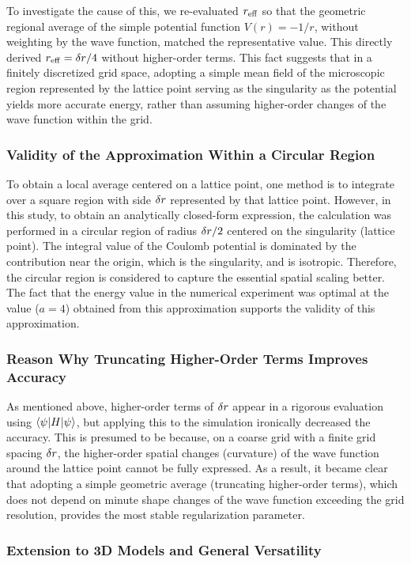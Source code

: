 \documentclass[jctc-draft.tex]{subfiles}
\begin{document}
To investigate the cause of this, we re-evaluated $r_{\mathrm{eff}}$ so that the geometric
regional average of the simple potential function $V(r)=-1/r$, without weighting
by the wave function, matched the representative value. This directly derived
$r_{\mathrm{eff}}=\delta r/4$ without higher-order terms. This fact suggests that in a
finitely discretized grid space, adopting a simple mean field of the microscopic
region represented by the lattice point serving as the singularity as the
potential yields more accurate energy, rather than assuming higher-order changes
of the wave function within the grid.

\subsubsection{Validity of the Approximation Within a Circular Region}
To obtain a local average centered on a lattice point, one method is to
integrate over a square region with side $\delta r$ represented by that lattice
point. However, in this study, to obtain an analytically closed-form expression,
the calculation was performed in a circular region of radius $\delta r/2$
centered on the singularity (lattice point). The integral value of the Coulomb
potential is dominated by the contribution near the origin, which is the
singularity, and is isotropic. Therefore, the circular region is considered to
capture the essential spatial scaling better. The fact that the energy value in
the numerical experiment was optimal at the value ($a=4$) obtained from this
approximation supports the validity of this approximation.

\subsubsection{Reason Why Truncating Higher-Order Terms Improves Accuracy}
As mentioned above, higher-order terms of $\delta r$ appear in a rigorous
evaluation using $\braket{\psi|H|\psi}$, but applying this to the simulation
ironically decreased the accuracy. This is presumed to be because, on a coarse
grid with a finite grid spacing $\delta r$, the higher-order spatial changes
(curvature) of the wave function around the lattice point cannot be fully
expressed. As a result, it became clear that adopting a simple geometric average
(truncating higher-order terms), which does not depend on minute shape changes
of the wave function exceeding the grid resolution, provides the most stable
regularization parameter.

\subsubsection{Extension to 3D Models and General Versatility}
\label{subsec:discussion-3d-extension}
\end{document}
